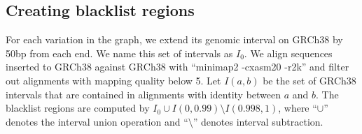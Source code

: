 \documentclass[twocolumn]{bmcart}
\begin{document}
\subsection*{Creating blacklist regions}

For each variation in the graph, we extend its genomic interval on GRCh38 by
50bp from each end. We name this set of intervals as $I_0$. We align sequences
inserted to GRCh38 against GRCh38 with ``minimap2 -cxasm20 -r2k'' and filter
out alignments with mapping quality below 5. Let $I(a,b)$ be the set of GRCh38
intervals that are contained in alignments with identity between $a$ and $b$.
The blacklist regions are computed by $I_0\cup I(0,0.99)\setminus I(0.998,1)$,
where ``$\cup$'' denotes the interval union operation and ``$\setminus$''
denotes interval subtraction.

\end{document}
